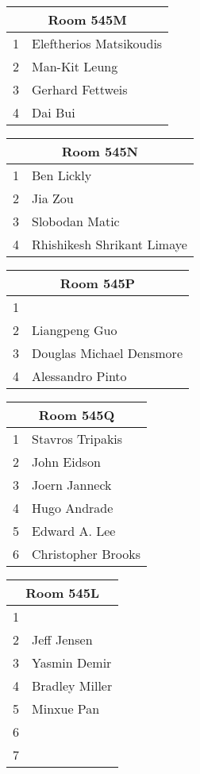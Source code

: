 \documentclass{article}
\begin{document}
\noindent
\begin{tabular}{|l|l|}
\hline
\multicolumn{2}{|c|}{Room 545M} \\ \hline\hline
1&Eleftherios Matsikoudis\\
2&Man-Kit Leung\\
3&Gerhard Fettweis\\
4&Dai Bui\\

\hline
\end{tabular}
\pagebreak

\noindent
\begin{tabular}{|l|l|}
\hline
\multicolumn{2}{|c|}{Room 545N} \\ \hline\hline
1&Ben Lickly\\
2&Jia Zou\\
3&Slobodan Matic\\
4&Rhishikesh Shrikant Limaye\\

\hline
\end{tabular}
\pagebreak

\noindent
\begin{tabular}{|l|l|}
\hline
\multicolumn{2}{|c|}{Room 545P} \\ \hline\hline
1& \\
2&Liangpeng Guo\\
3&Douglas Michael Densmore\\
4&Alessandro Pinto\\

\hline
\end{tabular}
\pagebreak

\noindent
\begin{tabular}{|l|l|}
\hline
\multicolumn{2}{|c|}{Room 545Q} \\ \hline\hline
1&Stavros Tripakis\\
2&John Eidson\\
3&Joern Janneck\\
4&Hugo Andrade\\
5&Edward A. Lee\\
6&Christopher Brooks\\

\hline
\end{tabular}
\pagebreak

\noindent
\begin{tabular}{|l|l|}
\hline
\multicolumn{2}{|c|}{Room 545L} \\ \hline\hline
1& \\
2&Jeff Jensen\\
3&Yasmin Demir\\
4&Bradley Miller\\
5&Minxue Pan\\
6& \\
7& \\

\hline
\end{tabular}
\pagebreak
\end{document}
